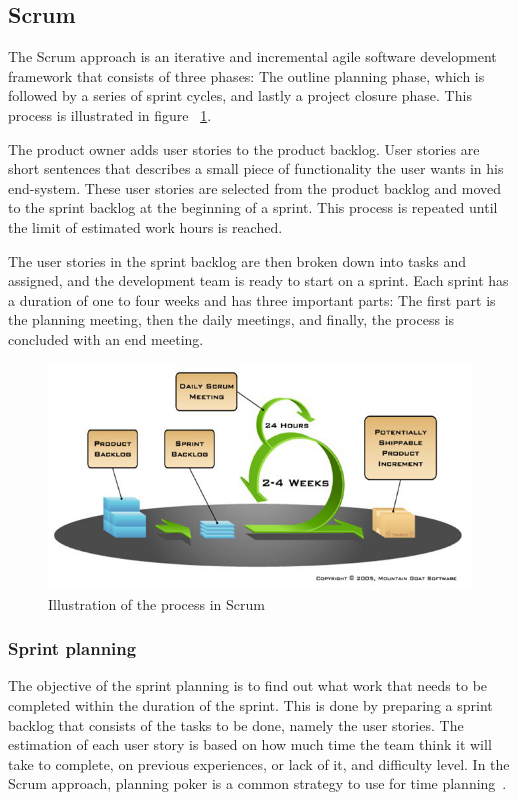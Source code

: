 \newpage
\subsection{Scrum}

\label{sec:scrumProjectManagement}

The Scrum approach is an iterative and incremental agile software development
framework that consists of three phases: The outline planning phase, which is
followed by a series of sprint cycles, and lastly a project closure phase. This process is illustrated in figure ~\ref{fig:scrumProcess}.

The product owner adds user stories to the product backlog. User stories are short sentences that describes a small piece of functionality the user wants in his end-system. These user stories are selected from the product backlog and moved to the sprint backlog at the beginning of a sprint. This process is repeated until the limit of estimated work hours is reached. 

The user stories in the sprint backlog are then broken down into tasks and assigned, and the development team is ready to start on a sprint. Each sprint has a duration of one to four weeks and has three important parts: The first part is the
planning meeting, then the daily  meetings, and finally, the process is
concluded with an end meeting. 
\begin{figure}[H]
\includegraphics[width=\textwidth]{ch/projectManagement/fig/sprintProcess.jpg}
\caption{Illustration of the process in Scrum}
\label{fig:scrumProcess}
\end{figure}


\subsubsection{Sprint planning}
\label{sec:sprintplanning}
The objective of the sprint planning is to find out what work that needs to be completed within the duration of the sprint. This is done by preparing a sprint backlog that consists of the tasks to be done, namely the user stories. The estimation of each user story is based on how much time the team think it will take to complete, on previous experiences, or lack of it, and difficulty level. In the Scrum approach, planning poker is a common strategy to use for time planning~\cite{planningpoker}.

